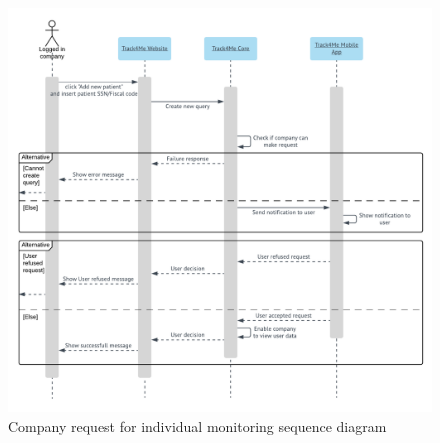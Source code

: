 \begin{figure}[H]
  \includegraphics[width=\textwidth,height=\textheight,keepaspectratio]{assets/sequence/CompanyRequestForIndividualMonitoring.pdf}
  \caption{Company request for individual monitoring sequence diagram}
  \label{fig:CompanyRequestForIndividualMonitoring}
\end{figure}
















\newpage
